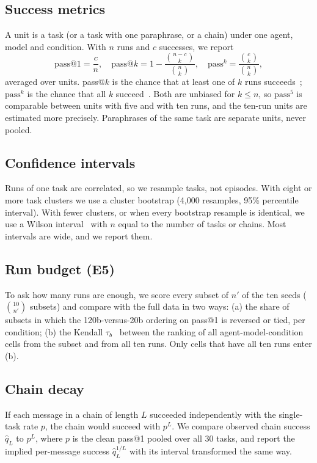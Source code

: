 \documentclass[10pt,a4paper,twocolumn]{article}
\makeatletter
\newcommand{\passk}[1]{\mathrm{pass}^{#1}}
\newcommand{\passat}[1]{\mathrm{pass@}#1}
\makeatother
\begin{document}
\subsection{Success metrics}
A unit is a task (or a task with one paraphrase, or a chain) under one agent, model and condition. With $n$ runs and $c$
successes, we report
\begin{equation}
\passat{1}=\frac{c}{n},\quad
\passat{k}=1-\frac{\binom{n-c}{k}}{\binom{n}{k}},\quad
\passk{k}=\frac{\binom{c}{k}}{\binom{n}{k}},
\end{equation}
averaged over units. pass@$k$ is the chance that at least one of $k$ runs succeeds~\cite{codex}; $\passk{k}$ is the
chance that all $k$ succeed~\cite{taubench}. Both are unbiased for $k\le n$, so $\passk{5}$ is comparable between units
with five and with ten runs, and the ten-run units are estimated more precisely. Paraphrases of the same task are
separate units, never pooled.

\subsection{Confidence intervals}
Runs of one task are correlated, so we resample tasks, not episodes. With eight or more task clusters we use a cluster
bootstrap (4,000 resamples, 95\% percentile interval). With fewer clusters, or when every bootstrap resample is
identical, we use a Wilson interval~\cite{wilson} with $n$ equal to the number of tasks or chains. Most intervals are
wide, and we report them.

\subsection{Run budget (E5)}
To ask how many runs are enough, we score every subset of $n'$ of the ten seeds ($\binom{10}{n'}$ subsets) and compare
with the full data in two ways: (a) the share of subsets in which the 120b-versus-20b ordering on pass@1 is reversed or
tied, per condition; (b) the Kendall $\tau_b$~\cite{kendall} between the ranking of all agent-model-condition cells from
the subset and from all ten runs. Only cells that have all ten runs enter (b).

\subsection{Chain decay}
If each message in a chain of length $L$ succeeded independently with the single-task rate $p$, the chain would succeed
with $p^L$. We compare observed chain success $\hat q_L$ to $p^L$, where $p$ is the clean pass@1 pooled over all 30
tasks, and report the implied per-message success $\hat q_L^{1/L}$ with its interval transformed the same way.
\end{document}
